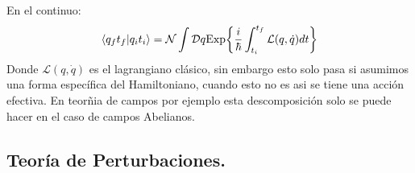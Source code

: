 En el continuo:
\begin{equation}
\langle q_{f}t_{f}|q_it_i\rangle=\mathcal{N}\int\mathcal{D}q\text{Exp\ensuremath{\left\{ \frac{i}{\hbar}\int_{t_{i}}^{t_{f}}\mathcal{L}(q,\dot{q})dt\right\} }}
\end{equation}
Donde $\mathcal{L}(q,\dot{q})$ es el lagrangiano clásico, sin embargo esto solo pasa si asumimos una forma específica del Hamiltoniano, cuando esto no es asi se tiene una acción efectiva. En teorñia de campos por ejemplo esta descomposición solo se puede hacer en el caso de campos Abelianos.
\newpage
 
 

\subsection{Teoría de Perturbaciones.}

